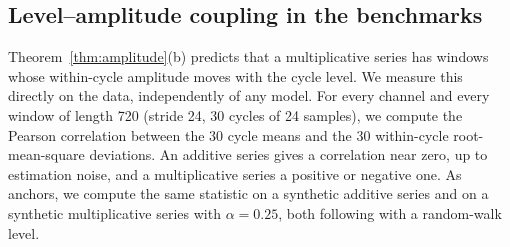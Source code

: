 {\subsection{Level--amplitude coupling in the benchmarks}
\label{sec:exp_coupling}

Theorem~\ref{thm:amplitude}(b) predicts that a multiplicative series has windows whose within-cycle amplitude moves with the cycle level. We measure this directly on the data, independently of any model. For every channel and every window of length 720 (stride 24, 30 cycles of 24 samples), we compute the Pearson correlation between the 30 cycle means and the 30 within-cycle root-mean-square deviations. An additive series gives a correlation near zero, up to estimation noise, and a multiplicative series a positive or negative one. As anchors, we compute the same statistic on a synthetic additive series and on a synthetic multiplicative series with $\alpha=0.25$, both following  with a random-walk level.

\begin{table}[t]
\end{table}

}
